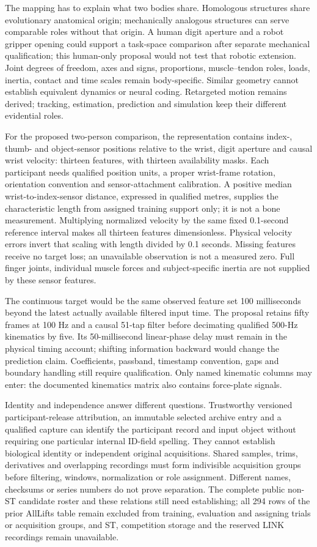 The mapping has to explain what two bodies share. Homologous structures share evolutionary anatomical origin; mechanically analogous structures can serve comparable roles without that origin. A human digit aperture and a robot gripper opening could support a task-space comparison after separate mechanical qualification; this human-only proposal would not test that robotic extension. Joint degrees of freedom, axes and signs, proportions, muscle--tendon roles, loads, inertia, contact and time scales remain body-specific. Similar geometry cannot establish equivalent dynamics or neural coding. Retargeted motion remains derived; tracking, estimation, prediction and simulation keep their different evidential roles.

For the proposed two-person comparison, the representation contains index-, thumb- and object-sensor positions relative to the wrist, digit aperture and causal wrist velocity: thirteen features, with thirteen availability masks. Each participant needs qualified position units, a proper wrist-frame rotation, orientation convention and sensor-attachment calibration. A positive median wrist-to-index-sensor distance, expressed in qualified metres, supplies the characteristic length from assigned training support only; it is not a bone measurement. Multiplying normalized velocity by the same fixed 0.1-second reference interval makes all thirteen features dimensionless. Physical velocity errors invert that scaling with length divided by 0.1 seconds. Missing features receive no target loss; an unavailable observation is not a measured zero. Full finger joints, individual muscle forces and subject-specific inertia are not supplied by these sensor features.

The continuous target would be the same observed feature set 100 milliseconds beyond the latest actually available filtered input time. The proposal retains fifty frames at 100 Hz and a causal 51-tap filter before decimating qualified 500-Hz kinematics by five. Its 50-millisecond linear-phase delay must remain in the physical timing account; shifting information backward would change the prediction claim. Coefficients, passband, timestamp convention, gaps and boundary handling still require qualification. Only named kinematic columns may enter: the documented kinematics matrix also contains force-plate signals.

Identity and independence answer different questions. Trustworthy versioned participant-release attribution, an immutable selected archive entry and a qualified capture can identify the participant record and input object without requiring one particular internal ID-field spelling. They cannot establish biological identity or independent original acquisitions. Shared samples, trims, derivatives and overlapping recordings must form indivisible acquisition groups before filtering, windows, normalization or role assignment. Different names, checksums or series numbers do not prove separation. The complete public non-ST candidate roster and these relations still need establishing; all 294 rows of the prior AllLifts table remain excluded from training, evaluation and assigning trials or acquisition groups, and ST, competition storage and the reserved LINK recordings remain unavailable.

